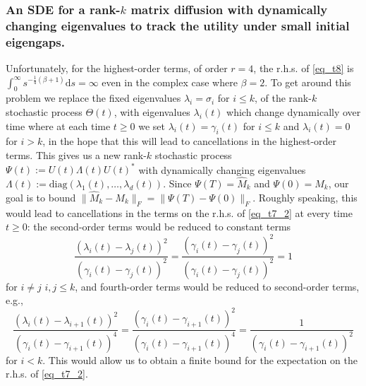 \documentclass[11pt,letterpaper]{article}
\begin{document}
\subsubsection{An SDE for a rank-$k$ matrix diffusion with dynamically changing eigenvalues to track the utility under small initial eigengaps.}
Unfortunately, for the highest-order terms, of order $r=4$, the r.h.s. of \eqref{eq_t8} is  $\int_0^\infty s^{-\frac{1}{4}{(\beta+1)}}\mathrm{d}s= \infty$ even in the complex case where $\beta = 2$.
%
To get around this problem we replace the fixed eigenvalues  $\lambda_i = \sigma_i$ for $i \leq k$, of the rank-$k$ stochastic process $\Theta(t)$, with eigenvalues $\lambda_i(t)$ which change dynamically over time where at each time $t \geq 0$ we set $\lambda_i(t) = \gamma_i(t)$ for $i \leq k$ and $\lambda_i(t) = 0$ for $i>k$, in the hope that this will lead to cancellations in the highest-order terms.
%
This gives us a new rank-$k$ stochastic process $\Psi(t):= U(t) \Lambda(t) U(t)^\ast$ with dynamically changing eigenvalues $\Lambda(t) :=\mathrm{diag}(\lambda_1(t), \ldots, \lambda_d(t))$.
%
Since $\Psi(T) = \hat{M}_k$ and $\Psi(0) = M_k$, our goal is to bound $\|\hat{M}_k - M_k \|_F = \|\Psi(T) - \Psi(0)\|_F$.
%
Roughly speaking, this would lead to cancellations in the terms on the r.h.s. of \eqref{eq_t7_2} at every time $t \geq 0$:  the second-order terms would be reduced to constant terms $$  \frac{(\lambda_i(t) - \lambda_j(t))^2}{(\gamma_i(t)-\gamma_j(t))^2} = \frac{(\gamma_i(t) - \gamma_j(t))^2}{(\gamma_i(t)-\gamma_j(t))^2} = 1$$ for $i\neq j$ $i,j \leq k$,
%
and fourth-order terms would be reduced to second-order terms, e.g.,  
 $$  \frac{(\lambda_i(t)- \lambda_{i+1}(t))^2}{(\gamma_i(t) - \gamma_{i+1}(t))^4} = \frac{(\gamma_i(t)- \gamma_{i+1}(t))^2}{(\gamma_i(t) - \gamma_{i+1}(t))^4} = \frac{1}{(\gamma_i(t)- \gamma_{i+1}(t))^2}$$ for $i< k$.
%
This would allow us to obtain a finite bound for the expectation on the r.h.s. of \eqref{eq_t7_2}.
\end{document}

